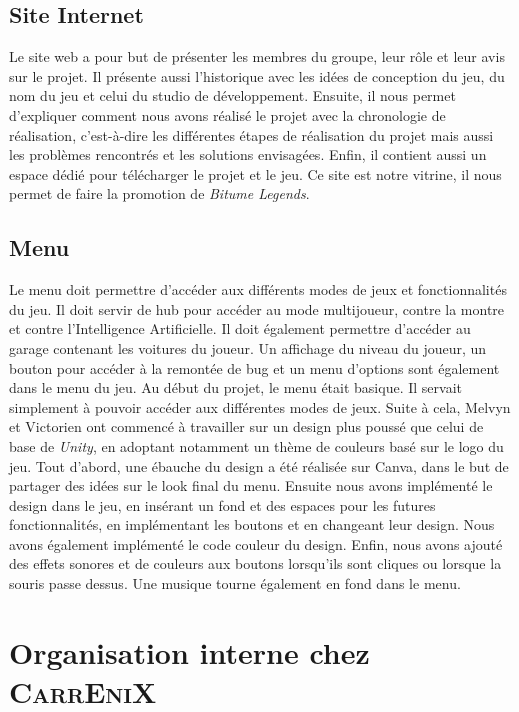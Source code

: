 \documentclass[12pt,a4paper]{article}
\newcommand{\btmlgs}{\textsl{Bitume Legends}}
\newcommand{\AI}{Intelligence Artificielle}
\newcommand{\CEX}{\textsc{CarrEniX}}
\begin{document}
    \subsection{Site Internet}
        Le site web a pour but de présenter les membres du groupe, leur rôle et leur avis sur le projet.
        Il présente aussi l'historique avec les idées de conception du jeu, du nom du jeu et celui du studio
        de développement. Ensuite, il nous permet d'expliquer comment nous avons réalisé le projet avec la
        chronologie de réalisation, c'est-à-dire les différentes étapes de réalisation du projet mais aussi
        les problèmes rencontrés et les solutions envisagées. Enfin, il contient aussi
        un espace dédié pour télécharger le projet et le jeu. Ce site est notre vitrine, il nous permet de faire
        la promotion de \btmlgs.
  
  
    \subsection{Menu}
        Le menu doit permettre d'accéder aux différents modes de jeux et fonctionnalités du jeu.
        Il doit servir de hub pour accéder au mode multijoueur, contre la montre et contre l'\AI.
        Il doit également permettre d'accéder au garage contenant les voitures du joueur. Un affichage
        du niveau du joueur, un bouton pour accéder à la remontée de bug et un menu d'options 
        sont également dans le menu du jeu. Au début du projet, le menu était basique. Il servait 
        simplement à pouvoir accéder aux différentes modes de jeux. Suite à cela, Melvyn et Victorien 
        ont commencé à travailler sur un design plus poussé que celui de base de \textsl{Unity}, 
        en adoptant notamment un thème de couleurs basé sur le logo du jeu. Tout d'abord, une
        ébauche du design a été réalisée sur Canva, dans le but de partager des idées sur le look
        final du menu. Ensuite nous avons implémenté le design dans le jeu, en insérant un fond
        et des espaces pour les futures fonctionnalités, en implémentant les boutons et en changeant
        leur design. Nous avons également implémenté le code couleur du design. Enfin, nous avons 
        ajouté des effets sonores et de couleurs aux boutons lorsqu'ils sont cliques ou lorsque
        la souris passe dessus. Une musique tourne également en fond dans le menu.

\clearpage

\section{Organisation interne chez \CEX}
\end{document}
